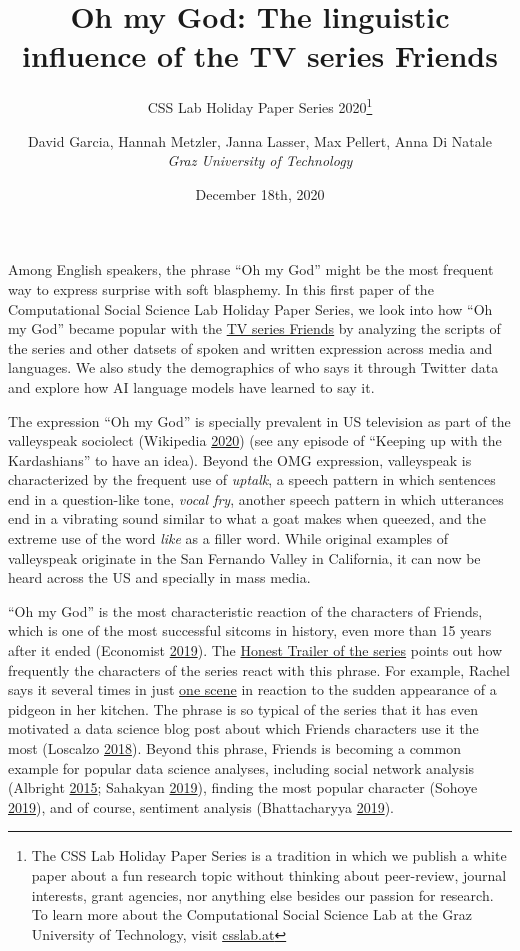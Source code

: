 \documentclass[]{article}
\title{Oh my God: The linguistic influence of the TV series Friends}
\subtitle{CSS Lab Holiday Paper Series 2020\footnote{The CSS Lab Holiday Paper Series is a tradition in which we publish a white paper about a fun research topic without thinking about peer-review, journal interests, grant agencies, nor anything else besides our passion for research. To learn more about the Computational Social Science Lab at the Graz University of Technology, visit \href{http://www.csslab.at}{csslab.at}}}
\author{David Garcia, Hannah Metzler, Janna Lasser, Max Pellert, Anna Di Natale\\
\emph{Graz University of Technology}}
\date{December 18th, 2020}
\begin{document}
\maketitle

Among English speakers, the phrase ``Oh my God'' might be the most frequent way to express surprise with soft blasphemy. In this first paper of the Computational Social Science Lab Holiday Paper Series, we look into how ``Oh my God'' became popular with the \href{https://www.imdb.com/title/tt0108778/}{TV series Friends} by analyzing the scripts of the series and other datsets of spoken and written expression across media and languages. We also study the demographics of who says it through Twitter data and explore how AI language models have learned to say it.

The expression ``Oh my God'' is specially prevalent in US television as part of the valleyspeak sociolect (Wikipedia \protect\hyperlink{ref-noauthor_valleyspeak_2020}{2020}) (see any episode of ``Keeping up with the Kardashians'' to have an idea). Beyond the OMG expression, valleyspeak is characterized by the frequent use of \emph{uptalk}, a speech pattern in which sentences end in a question-like tone, \emph{vocal fry}, another speech pattern in which utterances end in a vibrating sound similar to what a goat makes when queezed, and the extreme use of the word \emph{like} as a filler word. While original examples of valleyspeak originate in the San Fernando Valley in California, it can now be heard across the US and specially in mass media.

``Oh my God'' is the most characteristic reaction of the characters of Friends, which is one of the most successful sitcoms in history, even more than 15 years after it ended (Economist \protect\hyperlink{ref-TheEconomist_2019}{2019}). The \href{https://youtu.be/oqDSrMK_Gyg?t=346}{Honest Trailer of the series} points out how frequently the characters of the series react with this phrase. For example, Rachel says it several times in just \href{https://www.youtube.com/watch?v=x7pPxerXmVo}{one scene} in reaction to the sudden appearance of a pidgeon in her kitchen. The phrase is so typical of the series that it has even motivated a data science blog post about which Friends characters use it the most (Loscalzo \protect\hyperlink{ref-loscalzo_2018}{2018}). Beyond this phrase, Friends is becoming a common example for popular data science analyses, including social network analysis (Albright \protect\hyperlink{ref-Albright2015}{2015}; Sahakyan \protect\hyperlink{ref-sahakyan_one_2019}{2019}), finding the most popular character (Sohoye \protect\hyperlink{ref-sohoye_one_2019}{2019}), and of course, sentiment analysis (Bhattacharyya \protect\hyperlink{ref-bhattacharyya_sentiment_2019}{2019}).
\end{document}
